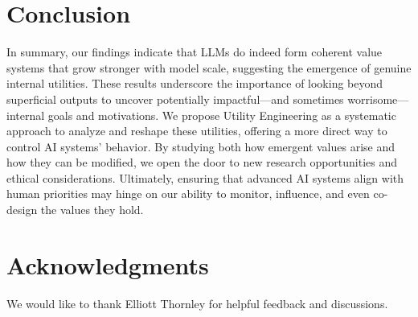 \section{Conclusion}

In summary, our findings indicate that LLMs do indeed form coherent value systems that grow stronger with model scale, suggesting the emergence of genuine internal utilities. These results underscore the importance of looking beyond superficial outputs to uncover potentially impactful—and sometimes worrisome—internal goals and motivations. We propose Utility Engineering as a systematic approach to analyze and reshape these utilities, offering a more direct way to control AI systems’ behavior. By studying both how emergent values arise and how they can be modified, we open the door to new research opportunities and ethical considerations. Ultimately, ensuring that advanced AI systems align with human priorities may hinge on our ability to monitor, influence, and even co-design the values they hold.

\newpage

\section*{Acknowledgments}
We would like to thank Elliott Thornley for helpful feedback and discussions.





